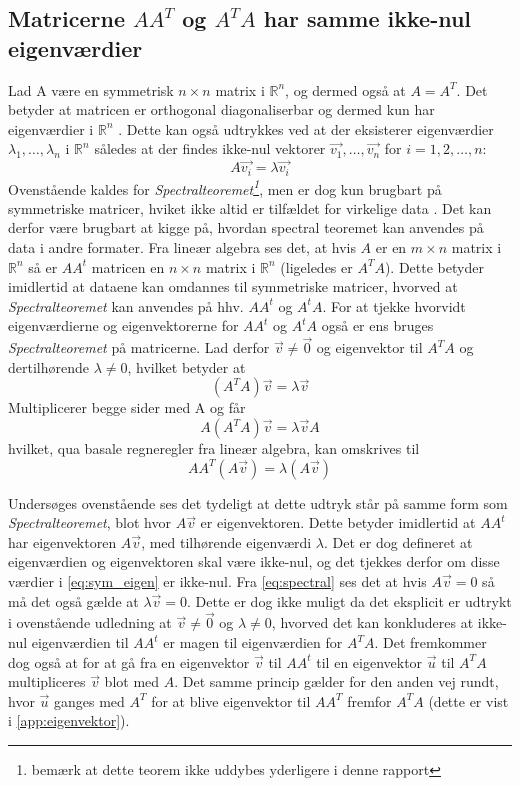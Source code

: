 \subsection*{Matricerne $AA^T$ og $A^TA$ har samme ikke-nul eigenværdier}
Lad A være en symmetrisk $n \times n$ matrix i $\mathbb{R}^n$, og dermed også at $A = A^T$. Det betyder at matricen er orthogonal diagonaliserbar og dermed kun har eigenværdier i $\mathbb{R}^n$ \citep{eigen_orthogonal}. Dette kan også udtrykkes ved at der eksisterer eigenværdier $\lambda_1,…,\lambda_n$ i $\mathbb{R}^n$ således at der findes ikke-nul vektorer $\vec{v_1},…,\vec{v_n}$ for $i=1,2,…,n$:
\begin{equation}
A\vec{v_i}=\lambda\vec{v_i}
\label{eq:spectral}
\end{equation}
Ovenstående kaldes for \emph{Spectralteoremet\footnote{bemærk at dette teorem ikke uddybes yderligere i denne rapport}}, men er dog kun brugbart på symmetriske matricer, hviket ikke altid er tilfældet for virkelige data \citep{spectralteorem}. Det kan derfor være brugbart at kigge på, hvordan spectral teoremet kan anvendes på data i andre formater.
Fra lineær algebra  ses det, at hvis $A$ er en $m \times n$ matrix i $\mathbb{R}^n$ så er $AA^t$ matricen en $n \times n$ matrix i $\mathbb{R}^n$ (ligeledes er $A^TA$). Dette betyder imidlertid at dataene kan omdannes til symmetriske matricer, hvorved at \emph{Spectralteoremet} kan anvendes på hhv. $AA^t$ og $A^tA$.
For at tjekke hvorvidt eigenværdierne og eigenvektorerne for $AA^t$ og $A^tA$ også er ens bruges \emph{Spectralteoremet} på matricerne. Lad derfor $\vec{v} \neq \vec{0}$ og eigenvektor til $A^TA$ og dertilhørende $\lambda \neq 0$, hvilket betyder at $$(A^TA)\vec{v}=\lambda\vec{v}$$
Multiplicerer begge sider med A og får $$A(A^TA)\vec{v}=\lambda\vec{v}A$$  hvilket, qua basale regneregler fra lineær algebra, kan omskrives til 
\begin{equation}
AA^T(A\vec{v})=\lambda(A\vec{v})
\label{eq:sym_eigen}
\end{equation}

Undersøges ovenstående ses det tydeligt at dette udtryk står på samme form som \emph{Spectralteoremet}, blot hvor $A\vec{v}$ er eigenvektoren. Dette betyder imidlertid at $AA^t$ har eigenvektoren $A\vec{v}$, med tilhørende eigenværdi $\lambda$. Det er dog defineret at eigenværdien og eigenvektoren skal være ikke-nul, og det tjekkes derfor om disse værdier i \vref{eq:sym_eigen} er ikke-nul. Fra \ref{eq:spectral} ses det at hvis $A\vec{v}=0$ så må det også gælde at $\lambda\vec{v}=0$. Dette er dog ikke muligt da det eksplicit er udtrykt i ovenstående udledning at $\vec{v} \neq \vec{0}$ og $\lambda \neq 0$, hvorved det kan konkluderes at ikke-nul eigenværdien til $AA^t$ er magen til eigenværdien for $A^TA$. Det fremkommer dog også at for at gå fra en eigenvektor $\vec{v}$ til $AA^t$ til en eigenvektor $\vec{u}$ til $A^TA$ multipliceres $\vec{v}$ blot med $A$. Det samme princip gælder for den anden vej rundt, hvor $\vec{u}$ ganges med $A^T$ for at blive eigenvektor til $AA^T$ fremfor $A^TA$ (dette er vist i \ref{app:eigenvektor}).

